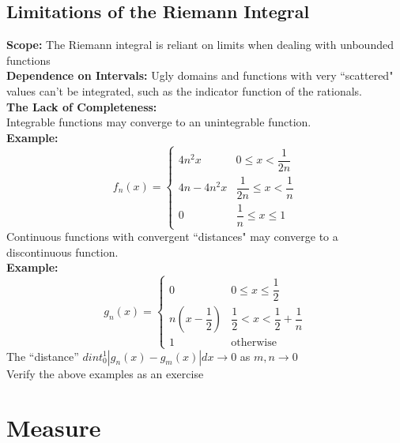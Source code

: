 \documentclass{article}
\newcommand{\0}{{\bf{0}}}
\newcommand{\1}{{\bf{1}}}
\begin{document}
\subsection{Limitations of the Riemann Integral}
\textbf{Scope:} The Riemann integral is reliant on limits when dealing with unbounded functions\\
\textbf{Dependence on Intervals:} Ugly domains and functions with very ``scattered" values can't be integrated, such as the indicator function of the rationals.\\
\textbf{The Lack of Completeness:}\\ Integrable functions may converge to an unintegrable function.\\
\textbf{Example:}
$$f_n(x)=\begin{cases}
    4n^2x&0\le x<\dfrac{1}{2n}\\[6pt]
    4n-4n^2x&\dfrac{1}{2n}\le x<\dfrac{1}{n}\\[6pt]
    0&\dfrac{1}{n}\le x\le1
\end{cases}$$
Continuous functions with convergent ``distances" may converge to a discontinuous function.\\
\textbf{Example:}
$$g_n(x)=\begin{cases}
    0&0\le x\le\dfrac{1}{2}\\[6pt]
    n\left(x-\dfrac{1}{2}\right)&\dfrac{1}{2}<x<\dfrac{1}{2}+\dfrac{1}{n}\\
    1&\mbox{otherwise}
\end{cases}$$
The ``distance'' $dint_0^1|g_n(x)-g_m(x)|dx\to0$ as $m,n\to0$\\
\null\hfill{Verify the above examples as an exercise}
\clearpage
\section{Measure}
\end{document}

